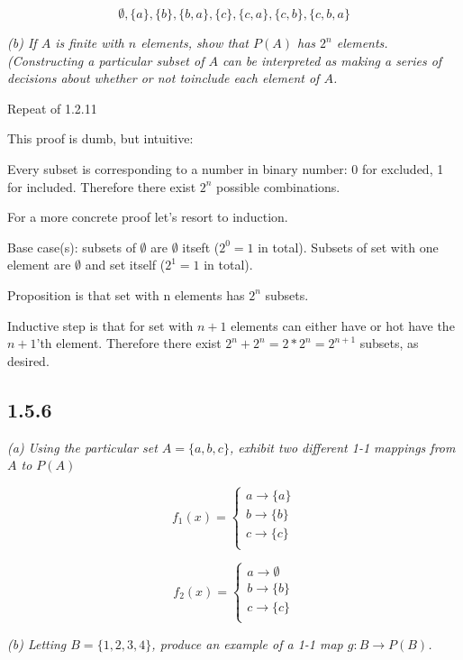 \documentclass[11pt,oneside,titlepage]{book}
\begin{document}
$$\emptyset, \{a\}, \{b\}, \{b, a\}, \{c\}, \{c, a\}, \{c, b\},  \{c, b, a\}$$

\textit{(b) If $A$ is finite with $n$ elements, show that $P(A)$ has $2^n$ elements.
  (Constructing a particular subset of $A$ can be interpreted as making a series of
  decisions about whether or not toinclude each element of $A$.}

Repeat of 1.2.11

This proof is dumb, but intuitive:

Every subset is corresponding to a number in binary number: 0 for excluded,
1 for included. Therefore there exist $2^n$ possible combinations.

For a more concrete proof let's resort to induction.

Base case(s): subsets of $\emptyset$ are $\emptyset$ itseft ($2^0 = 1$ in total). Subsets of
set with one element are $\emptyset$ and set itself ($2^1 = 1$ in total).

Proposition is that set with n elements has $2^n$ subsets.

Inductive step is that for set with $n + 1$ elements can either have or hot
have the $n + 1$'th element. Therefore there exist $2^n + 2^n = 2 * 2^n =
2^{n + 1}$ subsets, as desired.

\subsection*{1.5.6}
\textit{(a) Using the particular set $A = \{a, b, c\}$, exhibit two different
  1-1 mappings from $A$ to $P(A)$}

\begin{equation}
  f_1(x) =
  \begin{cases}
    a \to \{a\} \\
    b \to \{b\} \\
    c \to \{c\} \\
  \end{cases}    
\end{equation}

\begin{equation}
  f_2(x) =
  \begin{cases}
    a \to \emptyset \\
    b \to \{b\} \\
    c \to \{c\} \\
  \end{cases}    
\end{equation}

\textit{(b) Letting $B = \{1, 2, 3, 4\}$, produce an example of a 1-1 map $g: B \to P(B)$.
}
\end{document}
